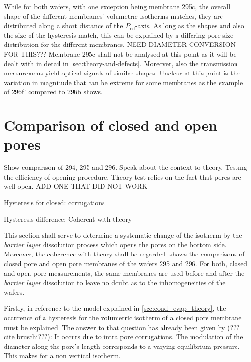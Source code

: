 \documentclass[../thesis.tex]{subfiles}
\begin{document}
        While for both wafers, with one exception being membrane 295c, the overall shape of the different membranes' volumetric isotherms matches, they are distributed along a short distance of the $P_\mathrm{rel}$-axis. As long as the shapes and also the size of the hysteresis match, this can be explained by a differing pore size distribution for the different membranes. NEED DIAMETER CONVERSION FOR THIS??? Membrane 295c shall not be analysed at this point as it will be dealt with in detail in \cref{sec:theory-and-defects}. Moreover, also the transmission measuremens yield optical signals of similar shapes. Unclear at this point is the variation in magnitude that can be extreme for some membranes as the example of 296f' compared to 296b shows.

        


      \section{Comparison of closed and open pores}
      \label{sec:comparison-cp-op}

        Show comparison of 294, 295 and 296. Speak about the context to theory. Testing the efficiency of opening procedure. Theory test relies on the fact that pores are well open. ADD ONE THAT DID NOT WORK

        Hysteresis for closed: corrugations

        Hysteresis difference: Coherent with theory
        \medskip

        This section shall serve to determine a systematic change of the isotherm by the \textit{barrier layer} dissolution process which opens the pores on the bottom side. Moreover, the coherence with theory shall be regarded.  shows the comparisons of closed pore and open pore membranes of the wafers 295 and 296. For both, closed and open pore measurements, the same membranes are used before and after the \textit{barrier layer} dissolution to leave no doubt as to the inhomogeneities of the wafers.

        

        Firstly, in reference to the model explained in \cref{sec:cond_evap_theory}, the occurence of a hysteresis for the volumetric isotherm of a closed pore membrane must be explained. The answer to that question has already been given by (???cite bruschi???): It occurs due to intra pore corrugations. The modulation of the diameter along the pore's length corresponds to a varying equilibrium pressure. This makes for a non vertical isotherm.
\end{document}
